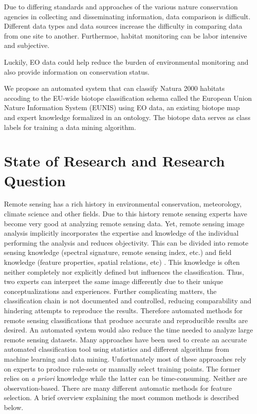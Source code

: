 \documentclass[authoryear, review,12pt,number]{elsarticle}
\begin{document}
Due to differing standards and approaches of the various nature conservation
agencies in collecting and disseminating information, data comparison is
difficult. Different data types and data sources increase the difficulty in
comparing data from one site to another. Furthermoe, habitat monitoring can
be labor intensive and subjective.

Luckily, EO data could help reduce the burden of environmental monitoring and
also provide information on conservation status.

We propose an automated system that can classify Natura 2000 habitats
accoding to the EU-wide biotope classification schema called the European Union
Nature Information System (EUNIS) using EO data, an existing biotope map and
expert knowledge formalized in an ontology. The biotope data serves as class
labels for training a data mining algorithm.

\section{State of Research and Research Question}
Remote sensing has a rich history in environmental conservation, meteorology,
climate science and other fields. Due to this history remote sensing experts
have become very good at analyzing remote sensing data. Yet, remote sensing
image analysis implicitly incorporates the expertise and knowledge of the
individual performing the analysis and reduces objectivity. This can be divided
into remote sensing knowledge (spectral signature, remote sensing index, etc.)
and field knowledge (feature properties, spatial relations, etc)
\citep{Andres2013a}. This knowledge is often neither completely nor explicitly
defined but influences the classification. Thus, two experts can interpret the
same image differently due to their unique conceptualizations and experiences.
Further complicating matters, the classification chain is not documented and
controlled, reducing comparability and hindering attempts to reproduce the
results\citep{Arvor2013}. Therefore automated methods for remote sensing
classifications that produce accurate and reproducible results are desired.
An automated system would also reduce the time needed to analyze large
remote sensing datasets. Many approaches have been used to create an accurate
automated classification tool using statistics and different algorithms
from machine learning and data mining. Unfortunately most of these approaches
rely on experts to produce rule-sets or manually select training points. The
former relies on \emph{a priori} knowledge while the latter can be
time-consuming.
Neither are observation-based. There are many different automatic methods
for feature selection. A brief overview explaining the most common methods is
described below.
\end{document}
